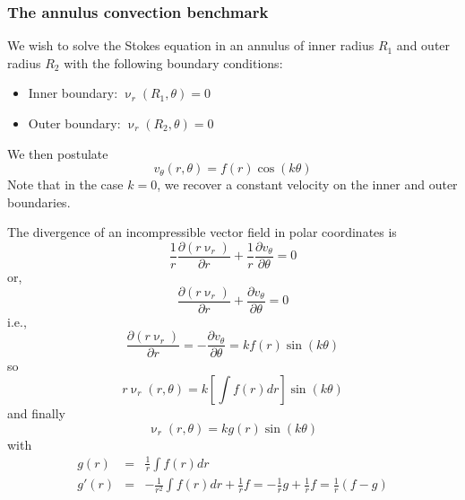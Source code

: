 

\subsubsection{The annulus convection benchmark} \label{ss:anconv}

We wish to solve the Stokes equation in an annulus of inner radius $R_1$
and outer radius $R_2$ with the following boundary conditions:
\begin{itemize}
\item Inner boundary: $\upnu_r(R_1,\theta)=0$ 
\item Outer boundary: $\upnu_r(R_2,\theta)=0$ 
\end{itemize}
We then postulate
\[
v_\theta(r,\theta)= f(r) \cos(k\theta)
\]
Note that in the case $k=0$, we recover a constant velocity on the inner and outer boundaries.

The divergence of an incompressible vector field in polar coordinates is
\[
\frac{1}{r} \frac{\partial (r\upnu_r)}{\partial r} + \frac{1}{r} \frac{\partial v_\theta}{\partial \theta} =0
\]
or, 
\[
\frac{\partial (r\upnu_r)}{\partial r} + \frac{\partial v_\theta}{\partial \theta} =0
\]
i.e.,
\[
\frac{\partial (r\upnu_r)}{\partial r} = - \frac{\partial v_\theta}{\partial \theta} = k f(r) \sin(k\theta) 
\]
so 
\[
r\upnu_r(r,\theta) = k \left[ \int f(r) dr \right] \sin(k\theta) 
\]
and finally 
\[
\upnu_r(r,\theta) = k g(r) \sin(k\theta)  
\]
with 
\begin{eqnarray}
g(r)  &=& \frac{1}{r} \int f(r) dr \\
g'(r) &=& -\frac{1}{r^2} \int f(r) dr + \frac{1}{r} f = - \frac{1}{r} g + \frac{1}{r} f = \frac{1}{r}(f-g) 
\end{eqnarray}


